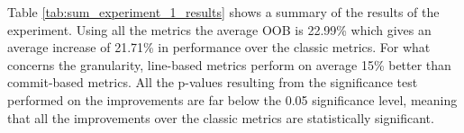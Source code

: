 Table \ref{tab:sum_experiment_1_results} shows a summary of the results of the experiment. Using all the metrics the average OOB is 22.99\% which gives an average increase of 21.71\%  in performance over the classic metrics. For what concerns the granularity, line-based metrics perform on average 15\% better than commit-based metrics. 
All the p-values resulting from the significance test performed on the improvements are far below the 0.05 significance level, meaning that all the improvements over the classic metrics are statistically significant. 



